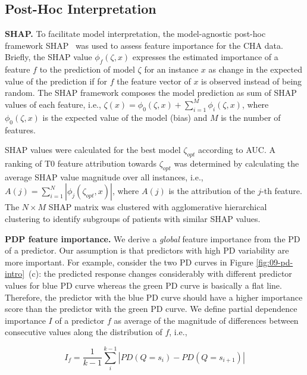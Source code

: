\documentclass[
  oneside]{book}
\begin{document}
\hypertarget{post-hoc-interpretation}{%
\subsection{Post-Hoc Interpretation}\label{post-hoc-interpretation}}

\textbf{SHAP.} To facilitate model interpretation, the model-agnostic post-hoc framework SHAP~\autocite{Lundberg:SHAP2017,Lundberg:TreeSHAP2019} was used to assess feature importance for the CHA data.
Briefly, the SHAP value \(\phi_f(\zeta,x)\) expresses the estimated importance of a feature \(f\) to the prediction of model \(\zeta\) for an instance \(x\) as change in the expected value of the prediction if for \(f\) the feature vector of \(x\) is observed instead of being random.
The SHAP framework composes the model prediction as sum of SHAP values of each feature, i.e., \(\zeta(x)=\phi_0(\zeta,x)+\sum_{i=1}^M \phi_i(\zeta,x)\), where \(\phi_0(\zeta,x)\) is the expected value of the model (bias) and \(M\) is the number of features.

SHAP values were calculated for the best model \(\zeta_{opt}\) according to AUC.
A ranking of T0 feature attribution towards \(\zeta_{opt}\) was determined by calculating the average SHAP value magnitude over all instances, i.e., \(A(j)=\sum_{i=1}^N |\phi_j(\zeta_{opt},x)|\),
where \(A(j)\) is the attribution of the \(j\)-th feature.
The \(N\times M\) SHAP matrix was clustered with agglomerative hierarchical clustering to identify subgroups of patients with similar SHAP values.

\textbf{PDP feature importance.} We derive a \emph{global} feature importance from the PD of a predictor.
Our assumption is that predictors with high PD variability are more important.
For example, consider the two PD curves in Figure \ref{fig:09-pd-intro}~(c): the predicted response changes considerably with different predictor values for blue PD curve whereas the green PD curve is basically a flat line.
Therefore, the predictor with the blue PD curve should have a higher importance score than the predictor with the green PD curve.
We define partial dependence importance \(I\) of a predictor \(f\) as average of the magnitude of differences between consecutive values along the distribution of \(f\), i.e.,

\begin{equation}
I_f = \frac{1}{k-1}\sum_{i}^{k-1} |PD(Q=s_i) - PD(Q=s_{i+1})|
\label{eq:pdp-imp}
\end{equation}
\end{document}
